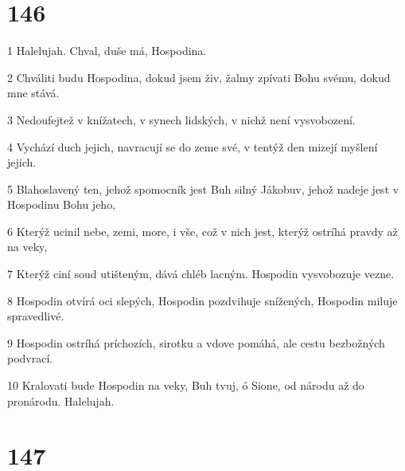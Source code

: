 \chapter{146}

\par 1 Halelujah. Chval, duše má, Hospodina.
\par 2 Chváliti budu Hospodina, dokud jsem živ, žalmy zpívati Bohu svému, dokud mne stává.
\par 3 Nedoufejtež v knížatech, v synech lidských, v nichž není vysvobození.
\par 4 Vychází duch jejich, navracují se do zeme své, v tentýž den mizejí myšlení jejich.
\par 5 Blahoslavený ten, jehož spomocník jest Buh silný Jákobuv, jehož nadeje jest v Hospodinu Bohu jeho,
\par 6 Kterýž ucinil nebe, zemi, more, i vše, což v nich jest, kterýž ostríhá pravdy až na veky,
\par 7 Kterýž ciní soud utišteným, dává chléb lacným. Hospodin vysvobozuje vezne.
\par 8 Hospodin otvírá oci slepých, Hospodin pozdvihuje snížených, Hospodin miluje spravedlivé.
\par 9 Hospodin ostríhá príchozích, sirotku a vdove pomáhá, ale cestu bezbožných podvrací.
\par 10 Kralovati bude Hospodin na veky, Buh tvuj, ó Sione, od národu až do pronárodu. Halelujah.

\chapter{147}

